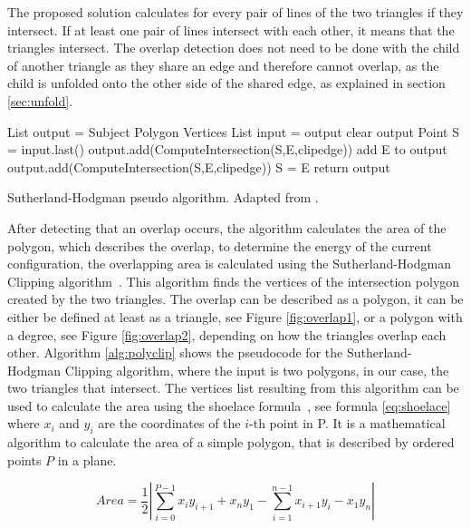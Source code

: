 \documentclass[draft,final]{vutinfth} %
\begin{document}
The proposed solution calculates for every pair of lines of the two triangles if they intersect. If at least one pair of lines intersect with each other, it means that the triangles intersect. The overlap detection does not need to be done with the child of another triangle as they share an edge and therefore cannot overlap, as the child is unfolded onto the other side of the shared edge, as explained in section \ref{sec:unfold}.

\begin{algorithm}
List output = Subject Polygon Vertices\;
{
List input = output\;
clear output\;
Point S = input.last()\;
{
{
{
output.add(ComputeIntersection(S,E,clipedge))\;
}
add E to output\;
}
{
{
output.add(ComputeIntersection(S,E,clipedge))\;
}
S = E\;
}
}
}
return output\;
\caption{Sutherland-Hodgman pseudo algorithm. Adapted from \cite{wiki:polygonclip}.}
\label{alg:polyclip}
\end{algorithm}

After detecting that an overlap occurs, the algorithm calculates the area of the polygon, which describes the overlap, to determine the energy of the current configuration, the overlapping area is calculated using the Sutherland-Hodgman Clipping algorithm~\cite{sutherland1974reentrant}. This algorithm finds the vertices of the intersection polygon created by the two triangles. The overlap can be described as a polygon, it can be either be defined at least as a triangle, see Figure \ref{fig:overlap1}, or a polygon with a degree, see Figure \ref{fig:overlap2}, depending on how the triangles overlap each other. Algorithm \ref{alg:polyclip} shows the pseudocode for the Sutherland-Hodgman Clipping algorithm, where the input is two polygons, in our case, the two triangles that intersect. The vertices list resulting from this algorithm can be used to calculate the area using the shoelace formula~\cite{vslapak2017automated}, see formula \ref{eq:shoelace} where $x_i$ and $y_i$ are the coordinates of the $i$-th point in P. It is a mathematical algorithm to calculate the area of a simple polygon, that is described by ordered points $P$ in a plane.

\begin{equation}
Area = \frac{1}{2} \left| \sum_{i=0}^{P-1} x_iy_{i+1} + x_ny_1 - \sum_{i=1}^{n-1} x_{i+1}y_i - x_1y_n \right|
\label{eq:shoelace}
\end{equation}
\end{document}
